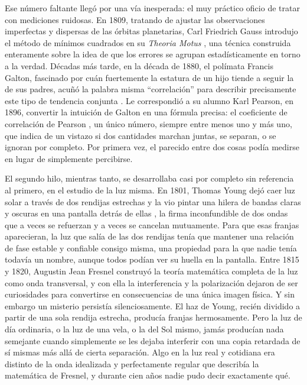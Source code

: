 	Ese número faltante llegó por una vía inesperada: el muy práctico oficio de tratar con mediciones ruidosas. En 1809, tratando de ajustar las observaciones imperfectas y dispersas de las órbitas planetarias, Carl Friedrich Gauss introdujo el método de mínimos cuadrados en su \textit{Theoria Motus} \cite{gauss1809theoria}, una técnica construida enteramente sobre la idea de que los errores se agrupan estadísticamente en torno a la verdad. Décadas más tarde, en la década de 1880, el polímata Francis Galton, fascinado por cuán fuertemente la estatura de un hijo tiende a seguir la de sus padres, acuñó la palabra misma ``correlación'' para describir precisamente este tipo de tendencia conjunta \cite{galton1888correlations}. Le correspondió a su alumno Karl Pearson, en 1896, convertir la intuición de Galton en una fórmula precisa: el coeficiente de correlación de Pearson \cite{pearson1896regression}, un único número, siempre entre menos uno y más uno, que indica de un vistazo si dos cantidades marchan juntas, se separan, o se ignoran por completo. Por primera vez, el parecido entre dos cosas podía medirse en lugar de simplemente percibirse.

	El segundo hilo, mientras tanto, se desarrollaba casi por completo sin referencia al primero, en el estudio de la luz misma. En 1801, Thomas Young dejó caer luz solar a través de dos rendijas estrechas y la vio pintar una hilera de bandas claras y oscuras en una pantalla detrás de ellas \cite{young1804bakerian}, la firma inconfundible de dos ondas que a veces se refuerzan y a veces se cancelan mutuamente. Para que esas franjas aparecieran, la luz que salía de las dos rendijas tenía que mantener una relación de fase estable y confiable consigo misma, una propiedad para la que nadie tenía todavía un nombre, aunque todos podían ver su huella en la pantalla. Entre 1815 y 1820, Augustin Jean Fresnel construyó la teoría matemática completa de la luz como onda transversal, y con ella la interferencia y la polarización dejaron de ser curiosidades para convertirse en consecuencias de una única imagen física. Y sin embargo un misterio persistía silenciosamente. El haz de Young, recién dividido a partir de una sola rendija estrecha, producía franjas hermosamente. Pero la luz de día ordinaria, o la luz de una vela, o la del Sol mismo, jamás producían nada semejante cuando simplemente se les dejaba interferir con una copia retardada de sí mismas más allá de cierta separación. Algo en la luz real y cotidiana era distinto de la onda idealizada y perfectamente regular que describía la matemática de Fresnel, y durante cien años nadie pudo decir exactamente qué.


